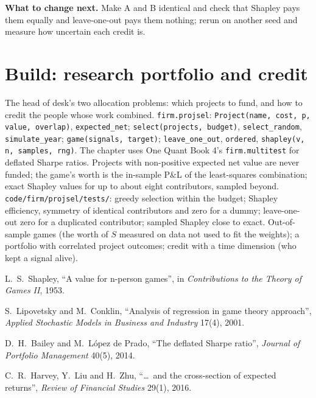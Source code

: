 \textbf{What to change next.} Make A and B identical and check that Shapley pays them equally and leave-one-out pays them nothing; rerun on
another seed and measure how uncertain each credit is.

\section{Build: research portfolio and credit}\label{bld:fm:managing-researchers-traders-and-engineers:projsel}

\begin{build}
 The head of desk's two allocation problems: which projects to fund, and how to credit the people whose work combined.
 \texttt{firm.projsel}: \texttt{Project(name, cost, p, value, overlap)}, \texttt{expected\_net}; \texttt{select(projects,
budget)}, \texttt{select\_random}, \texttt{simulate\_year}; \texttt{game(signals, target)}; \texttt{leave\_one\_out}, \texttt{ordered},
\texttt{shapley(v, n, samples, rng)}. The chapter uses One Quant Book 4's \texttt{firm.multitest} for deflated Sharpe ratios.
 Projects with non-positive expected net value are never funded; the game's worth is the in-sample P\&L of the least-squares
combination; exact Shapley values for up to about eight contributors, sampled beyond.
 \texttt{code/firm/projsel/tests/}: greedy selection within the budget; Shapley efficiency, symmetry of identical
contributors and zero for a dummy; leave-one-out zero for a duplicated contributor; sampled Shapley close to exact.
 Out-of-sample games (the worth of $S$ measured on data not used to fit the weights); a portfolio with correlated project
outcomes; credit with a time dimension (who kept a signal alive).
\end{build}

\begin{omsources}
\item L.~S.~Shapley, ``A value for n-person games'', in \emph{Contributions to the Theory of Games II}, 1953.
\item S.~Lipovetsky and M.~Conklin, ``Analysis of regression in game theory approach'', \emph{Applied Stochastic Models in Business and Industry}
17(4), 2001.
\item D.~H.~Bailey and M.~López de Prado, ``The deflated Sharpe ratio'', \emph{Journal of Portfolio Management} 40(5), 2014.
\item C.~R.~Harvey, Y.~Liu and H.~Zhu, ``\dots\ and the cross-section of expected returns'', \emph{Review of Financial Studies} 29(1), 2016.
\end{omsources}

